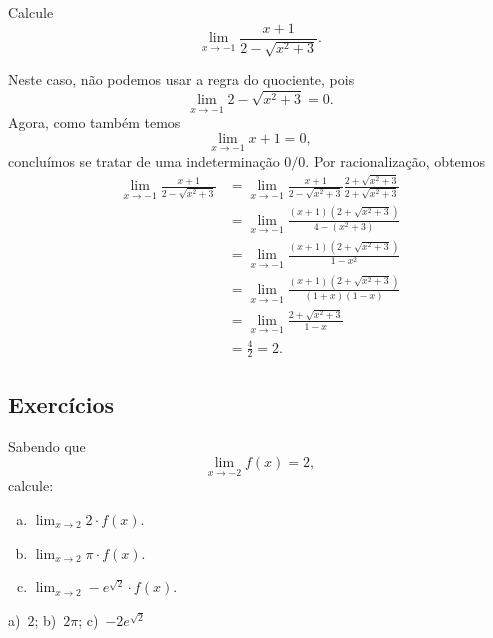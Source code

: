\begin{exeresol}
  Calcule
  \begin{equation}
    \lim_{x\to -1} \frac{x+1}{2-\sqrt{x^2+3}}.
  \end{equation}
\end{exeresol}
\begin{resol}
  Neste caso, não podemos usar a regra do quociente, pois
  \begin{equation}
    \lim_{x\to -1} 2-\sqrt{x^2+3} = 0.
  \end{equation}
  Agora, como também temos
  \begin{equation}
    \lim_{x\to -1} x+1 = 0,
  \end{equation}
  concluímos se tratar de uma indeterminação $0/0$. Por racionalização, obtemos
  \begin{align}
    \lim_{x\to -1} \frac{x+1}{2-\sqrt{x^2+3}} &= \lim_{x\to -1} \frac{x+1}{2-\sqrt{x^2+3}}\frac{2+\sqrt{x^2+3}}{2+\sqrt{x^2+3}} \\
                                              &= \lim_{x\to -1} \frac{(x+1)(2+\sqrt{x^2+3})}{4 - (x^2+3)}\\
                                              &= \lim_{x\to -1} \frac{(x+1)(2+\sqrt{x^2+3})}{1-x^2}\\
                                              &= \lim_{x\to -1} \frac{(x+1)(2+\sqrt{x^2+3})}{(1+x)(1-x)}\\
                                              &= \lim_{x\to -1} \frac{2+\sqrt{x^2+3}}{1-x} \\
                                              &= \frac{4}{2} = 2.
  \end{align}
\end{resol}

\subsection*{Exercícios}

\begin{exer}
  Sabendo que
  \begin{equation}
    \lim_{x\to -2} f(x) = 2,
  \end{equation}
  calcule:
  \begin{enumerate}[a)]
  \item $\displaystyle \lim_{x\to 2} 2\cdot f(x)$.
  \item $\displaystyle \lim_{x\to 2} \pi\cdot f(x)$.
  \item $\displaystyle \lim_{x\to 2} -e^{\sqrt{2}}\cdot f(x)$.
  \end{enumerate}
\end{exer}
\begin{resp}
  a)~$2$; b)~$2\pi$; c)~$-2e^{\sqrt{2}}$
\end{resp}

